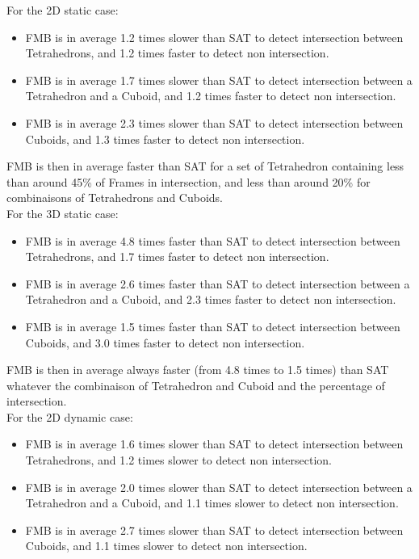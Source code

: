 \documentclass[12pt, a4paper]{article}
\begin{document}
For the 2D static case:\\

\begin{itemize}
\item FMB is in average 1.2 times slower than SAT to detect intersection between Tetrahedrons, and 1.2 times faster to detect non intersection.\\
\item FMB is in average 1.7 times slower than SAT to detect intersection between a Tetrahedron and a Cuboid, and 1.2 times faster to detect non intersection.\\
\item FMB is in average 2.3 times slower than SAT to detect intersection between Cuboids, and 1.3 times faster to detect non intersection.\\
\end{itemize}

FMB is then in average faster than SAT for a set of Tetrahedron containing less than around 45\% of Frames in intersection, and less than around 20\% for combinaisons of Tetrahedrons and Cuboids.\\ 

For the 3D static case:\\

\begin{itemize}
\item FMB is in average 4.8 times faster than SAT to detect intersection between Tetrahedrons, and 1.7 times faster to detect non intersection.\\
\item FMB is in average 2.6 times faster than SAT to detect intersection between a Tetrahedron and a Cuboid, and 2.3 times faster to detect non intersection.\\
\item FMB is in average 1.5 times faster than SAT to detect intersection between Cuboids, and 3.0 times faster to detect non intersection.\\
\end{itemize}

FMB is then in average always faster (from 4.8 times to 1.5 times) than SAT whatever the combinaison of Tetrahedron and Cuboid and the percentage of intersection.\\ 

For the 2D dynamic case:\\

\begin{itemize}
\item FMB is in average 1.6 times slower than SAT to detect intersection between Tetrahedrons, and 1.2 times slower to detect non intersection.\\
\item FMB is in average 2.0 times slower than SAT to detect intersection between a Tetrahedron and a Cuboid, and 1.1 times slower to detect non intersection.\\
\item FMB is in average 2.7 times slower than SAT to detect intersection between Cuboids, and 1.1 times slower to detect non intersection.\\
\end{itemize}
\end{document}
